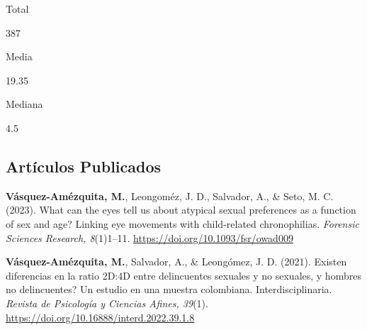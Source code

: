 \documentclass[11pt,a4paper,]{awesome-cv}
\begin{document}
\begin{tcolorbox}
  \begin{minipage}[c]{0.325\linewidth}  
    \begin{center} 
      \begin{small} Total \end{small} 
      \begin{LARGE} 387 \end{LARGE} 
    \end{center}
  \end{minipage} 
  \begin{minipage}[c]{0.325\linewidth}
    \begin{center} 
      \begin{small} Media \end{small} 
      \begin{LARGE} 19.35 \end{LARGE}
    \end{center}
  \end{minipage} 
  \begin{minipage}[c]{0.325\linewidth}
    \begin{center}  
      \begin{small} Mediana \end{small} 
      \begin{LARGE} 4.5 \end{LARGE}
   \end{center}
  \end{minipage} 
\end{tcolorbox}

\subsection{\texorpdfstring{\textbf{Artículos Publicados}}{}}\label{section}

\begingroup
\footnotesize
\setlength{\parindent}{-0.5in}
\setlength{\leftskip}{0.5in}

\textbf{Vásquez-Amézquita, M.}, Leongoméz, J. D., Salvador, A., \& Seto,
M. C. (2023). What can the eyes tell us about atypical sexual
preferences as a function of sex and age? Linking eye movements with
child-related chronophilias. \emph{Forensic Sciences Research,
8}(1)1--11. \url{https://doi.org/10.1093/fsr/owad009}

\textbf{Vásquez-Amézquita, M.}, Salvador, A., \& Leongómez, J. D.
(2021). Existen diferencias en la ratio 2D:4D entre delincuentes
sexuales y no sexuales, y hombres no delincuentes? Un estudio en una
muestra colombiana. Interdisciplinaria. \emph{Revista de Psicología y
Ciencias Afines, 39}(1).
\url{https://doi.org/10.16888/interd.2022.39.1.8}
\end{document}
